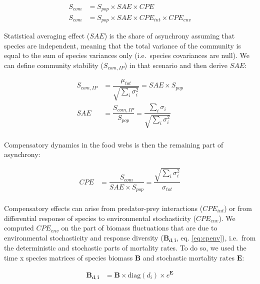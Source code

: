 \documentclass[
]{article}
\begin{document}
\begin{equation}
\begin{aligned}
S_{com} &= S_{pop} \times SAE \times CPE \\
S_{com} &= S_{pop} \times SAE \times CPE_{int} \times CPE_{env}
\label{eq:scom2}
\end{aligned}
\end{equation}

Statistical averaging effect (\(SAE\)) is the share of asynchrony assuming that
species are independent, meaning that the total variance of the community is
equal to the sum of species variances only (i.e.~species covariances are null).
We can define community stability (\(S_{com, IP}\)) in that scenario and then
derive \(SAE\):

\begin{equation}
\begin{aligned}
S_{com, IP} &= \dfrac{\mu_{tot}}{\sqrt{\sum_i \sigma^2_i}} = SAE \times S_{pop} \\
SAE &= \dfrac{S_{com, IP}}{S_{pop}} = \dfrac{\sum_i \sigma_i}{\sqrt{\sum_i \sigma^2_i}}\\
\end{aligned}
\label{eq:sae2}
\end{equation}

Compensatory dynamics in the food webs is then the remaining part of asynchrony:

\begin{equation}
\begin{aligned}
CPE &= \dfrac{S_{com}}{SAE \times S_{pop}} = \dfrac{\sqrt{\sum_i \sigma^2_i}}{\sigma_{tot}}\\
\end{aligned}
\label{eq:cpe}
\end{equation}

Compensatory effects can arise from predator-prey interactions
(\(CPE_{int}\)) or from differential response of species to environmental
stochasticity (\(CPE_{env}\)). We computed \(CPE_{env}\) on the part of
biomass fluctuations that are due to environmental stochasticity and response
diversity (\(\mathbf{B_{d, i}}\), eq. \eqref{eq:cpenv}), i.e.~from the
deterministic and stochastic parts of mortality rates. To do so, we used the
time x species matrices of species biomass \(\mathbf{B}\) and stochastic mortality
rates \(\mathbf{E}\):

\begin{equation}
\begin{aligned}
\mathbf{B_{d, i}} &= \mathbf{B} \times \mathrm{diag}(d_i) \times e^\mathbf{E}
\end{aligned}
\label{eq:cpenv}
\end{equation}
\end{document}
